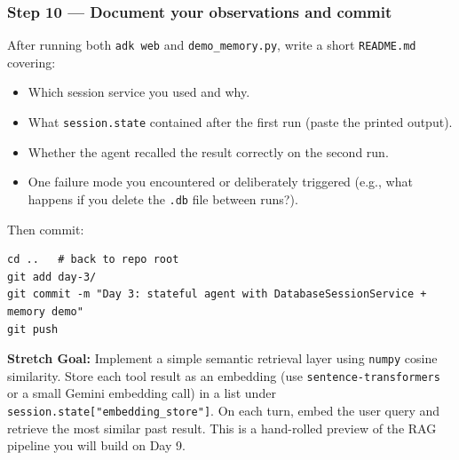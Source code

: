 \documentclass[12pt, a4paper]{article}
\begin{document}
\begin{practicalbox}
\subsubsection*{Step 10 --- Document your observations and commit}

After running both \texttt{adk web} and \texttt{demo\_memory.py}, write a
short \texttt{README.md} covering:

\begin{itemize}[leftmargin=*, itemsep=2pt]
  \item Which session service you used and why.
  \item What \texttt{session.state} contained after the first run (paste the
    printed output).
  \item Whether the agent recalled the result correctly on the second run.
  \item One failure mode you encountered or deliberately triggered (e.g.,
    what happens if you delete the \texttt{.db} file between runs?).
\end{itemize}

Then commit:

\begin{lstlisting}[style=bashstyle]
cd ..   # back to repo root
git add day-3/
git commit -m "Day 3: stateful agent with DatabaseSessionService + memory demo"
git push
\end{lstlisting}

\medskip

\begin{stretchbox}
\textbf{Stretch Goal:} Implement a simple semantic retrieval layer using
\texttt{numpy} cosine similarity. Store each tool result as an embedding
(use \texttt{sentence-transformers} or a small Gemini embedding call) in a
list under \texttt{session.state["embedding\_store"]}. On each turn, embed
the user query and retrieve the most similar past result. This is a
hand-rolled preview of the RAG pipeline you will build on Day 9.
\end{stretchbox}

\end{practicalbox}

\vspace{1.5em}
\end{document}
